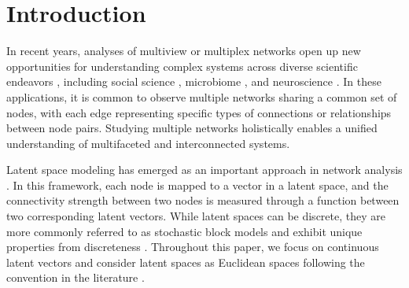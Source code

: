 \documentclass[12pt]{article}
\begin{document}
\section{Introduction} 
In recent years,  analyses of multiview or multiplex networks \citep{kivela2014multilayer} open up new opportunities for understanding complex systems across diverse scientific endeavors \citep{salter2017latent}, including social science \citep{lazega2001collegial,banerjee2013diffusion},  microbiome  \citep{gould2018microbiome}, and neuroscience \citep{wen2022characterizing}. 
In these applications, it is common to observe multiple networks sharing a common set of nodes, with each edge representing specific types of connections or relationships between node pairs.  
Studying multiple networks holistically 
enables a unified understanding of multifaceted and  interconnected systems.

Latent space modeling has emerged as an important approach  in network analysis  
 \citep{hoff2002latent,matias2014modeling}. In this framework, each node is mapped to a  vector in a latent space, and the connectivity strength  between two nodes is measured through a function between two corresponding latent vectors. 
While latent spaces can be discrete, they are 
more commonly referred to as stochastic block models and exhibit unique properties  from discreteness 
\citep{holland1983stochastic}.  
Throughout this paper, we focus on continuous latent vectors and consider latent spaces as  Euclidean spaces  following the convention in the literature \citep{hoff2002latent}. 
\end{document}
